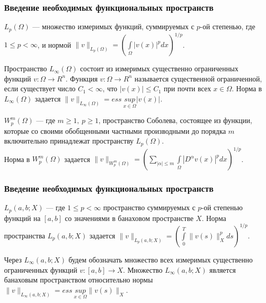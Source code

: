 \documentclass[10pt, pdf, hyperref={unicode}]{beamer}
\begin{document}
  \begin{frame}
    \frametitle{Введение необходимых функциональных пространств}
    \begin{center}
      \begin{minipage}[h]{0.97\linewidth}
        $L_p(\Omega)$ --- множество измеримых функций, суммируемых с $p$-ой степенью, где $1\le p< \infty$,
        и нормой $\|v\|_{L_p(\Omega)}=(\int\limits_\Omega |v(x)|^pdx)^{1/p}$.

        Пространство $L_{\infty}(\Omega)$ состоит из измеримых существенно ограниченных функций $v:\Omega\rightarrow R^n$. 
        Функция $v:\Omega\rightarrow R^n$ называется существенной ограниченной,
        если существует число $C_1<\infty$, что $|v(x)|\le C_1$ при почти всех $x\in\Omega$.
        Норма в $L_{\infty}(\Omega)$ задается
        $\|v\|_{L_{\infty}(\Omega)}=ess \ \underset{x\in\Omega}{sup} |v(x)|$.

        $W_p^m(\Omega)$ --- где $m\geqslant 1, \ p\geqslant 1$, пространство Соболева, состоящее из
        функции, которые со своими обобщенными частными производными до порядка
        $m$ включительно принадлежат пространству $L_p(\Omega)$.\\
        Норма в $W_p^m(\Omega)$ задается
        $\|v\|_{W_p^m(\Omega)}=\left(\sum\limits_{|\alpha|\leqslant m} \int\limits_\Omega |D^{\alpha}v(x)|^pdx\right)^{1/p}$.
      \end{minipage}
    \end{center}
  \end{frame}


  \begin{frame}
    \frametitle{Введение необходимых функциональных пространств}
    \begin{center}
      \begin{minipage}[h]{0.97\linewidth}
        $L_p(a,b;X)$ --- где $1\le p< \infty$ пространство суммируемых с
        $p$-ой степенью функций на $[a, b]$ со значениями в
        банаховом пространстве $X$. Норма пространства $L_p(a, b;X)$ задается 
        $\|v\|_{L_p(a, b;X)}=(\int\limits_0^T\|v(s)\|_X^p ds)^{1/p}.$

        Через $L_{\infty}(a,b;X)$ будем обозначать множество всех измеримых существенно ограниченных функций
        $v:[a,b]\rightarrow X$.
        Множество $L_{\infty}(a,b;X)$ является банаховым пространством относительно нормы
        $\|v\|_{L_{\infty}(a,b;X)}=ess \ \underset{x\in\Omega}{sup} \|v(s)\|_X$.
      \end{minipage}
    \end{center}
  \end{frame}
\end{document}
